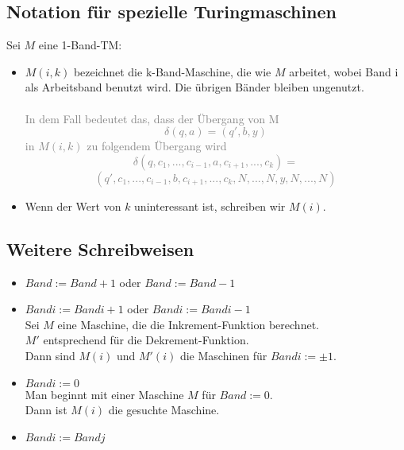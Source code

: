 \documentclass{article}
\begin{document}
		\subsection{Notation für spezielle Turingmaschinen}
		Sei $M$ eine 1-Band-TM:
		\begin{itemize}
			\item $M(i,k)$ bezeichnet die k-Band-Maschine, die wie $M$ arbeitet, wobei Band i als Arbeitsband benutzt wird. Die übrigen Bänder bleiben ungenutzt. \\
			\\
			\textcolor{gray}{In dem Fall bedeutet das, dass der Übergang von M
			\[\delta(q,a) = (q',b,y)\]
			in $M(i,k)$ zu folgendem Übergang wird
			\[\delta(q,c_1,...,c_{i-1},a,c_{i+1},...,c_k) = \]
			\[(q',c_1,...,c_{i-1},b,c_{i+1},...,c_k,N,...,N,y,N,...,N)\]}
			\item Wenn der Wert von $k$ uninteressant ist, schreiben wir $M(i)$.
			
		\end{itemize}
		\subsection{Weitere Schreibweisen}
		\begin{itemize}
			\item $Band := Band+1$ oder $Band := Band-1$
			\item $Band i := Band i + 1$ oder $Band i := Band i - 1$ \\
			Sei $M$ eine Maschine, die die Inkrement-Funktion berechnet. \\
			$M'$ entsprechend für die Dekrement-Funktion.\\
			Dann sind $M(i)$ und $M'(i)$ die Maschinen für $Band i := \pm 1$.
			\item $Band i := 0$ \\
			Man beginnt mit einer Maschine $M$ für $Band := 0$. \\
			Dann ist $M(i)$ die gesuchte Maschine.
			\item $Band i := Band j$
		\end{itemize}
\end{document}
